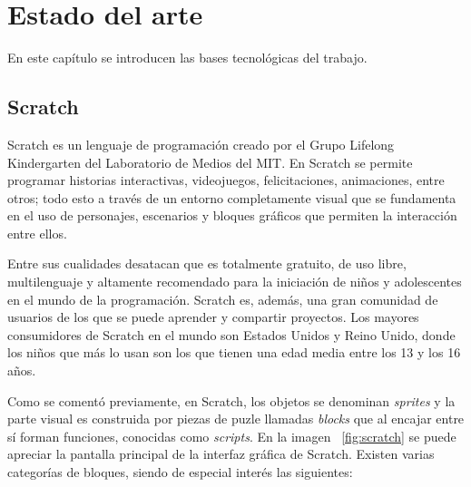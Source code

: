 \documentclass[a4paper, 12pt]{book}
\begin{document}


\cleardoublepage
\chapter{Estado del arte}
\label{chap:estado}

En este capítulo se introducen las bases tecnológicas del trabajo.

\section{Scratch}
\label{sec:Scratch}

Scratch es un lenguaje de programación creado por el Grupo Lifelong Kindergarten del Laboratorio de Medios del MIT. En Scratch se permite programar historias interactivas, videojuegos, felicitaciones, animaciones, entre otros; todo esto a través de un entorno completamente visual que se fundamenta en el uso de personajes, escenarios y bloques gráficos que permiten la interacción entre ellos.


Entre sus cualidades desatacan que es totalmente gratuito, de uso libre, multilenguaje y altamente recomendado para la iniciación de niños y adolescentes en el mundo de la programación. Scratch es, además, una gran comunidad de usuarios de los que se puede aprender y compartir proyectos. Los mayores consumidores de Scratch en el mundo son Estados Unidos y Reino Unido, donde los niños que más lo usan son los que tienen una edad media entre los 13 y los 16 años.

Como se comentó previamente, en Scratch, los objetos se denominan \textit{sprites} y la parte visual es construida por piezas de puzle llamadas \textit{blocks} que al encajar entre sí forman funciones, conocidas como \textit{scripts}. En la imagen ~\ref{fig:scratch} se puede apreciar la pantalla principal de la interfaz gráfica de Scratch. Existen varias categorías de bloques, siendo de especial interés las siguientes: 
\end{document}
